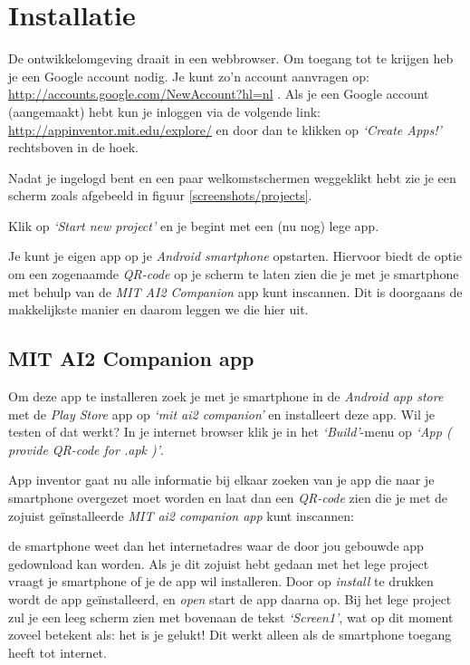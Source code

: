 \chapter{Installatie}

De \ai ontwikkelomgeving draait in een webbrowser. Om toegang tot \ai te krijgen heb je een Google account nodig. Je kunt zo'n account aanvragen op: \url{http://accounts.google.com/NewAccount?hl=nl} . Als je een Google account (aangemaakt) hebt kun je inloggen via de volgende link: \url{http://appinventor.mit.edu/explore/} en door dan te klikken op \emph{`Create Apps!'} rechtsboven in de hoek.


Nadat je ingelogd bent en een paar welkomstschermen weggeklikt hebt zie je een scherm zoals afgebeeld in figuur \ref{screenshots/projects}.


Klik op \emph{`Start new project'} en je begint met een (nu nog) lege app. 

Je kunt je eigen app op je \emph{Android smartphone} opstarten. Hiervoor biedt \ai de optie om een zogenaamde \emph{QR-code} op je scherm te laten zien die je met je smartphone met behulp van de \emph{MIT AI2 Companion} app kunt inscannen. Dit is doorgaans de makkelijkste manier en daarom leggen we die hier uit. 

\section{MIT AI2 Companion app}
Om deze app te installeren zoek je met je smartphone in de \emph{Android app store} met de \emph{Play Store} app op \emph{`mit ai2 companion'} en installeert deze app. Wil je testen of dat werkt? In je internet browser klik je in het \emph{`Build'}-menu op \emph{`App ( provide QR-code for .apk )'}.
 

App inventor gaat nu alle informatie bij elkaar zoeken van je app die naar je smartphone overgezet moet worden en laat dan een \emph{QR-code} zien die je met de zojuist ge\"installeerde \emph{MIT ai2 companion app} kunt inscannen: 


de smartphone weet dan het internetadres waar de door jou gebouwde app gedownload kan worden. Als je dit zojuist hebt gedaan met het lege project vraagt je smartphone of je de app wil installeren. Door op \emph{install} te drukken wordt de app ge\"installeerd, en \emph{open} start de app daarna op. Bij het lege project zul je een leeg scherm zien met bovenaan de tekst \emph{`Screen1'}, wat op dit moment zoveel betekent als: het is je gelukt! Dit werkt alleen als de smartphone toegang heeft tot internet. 

